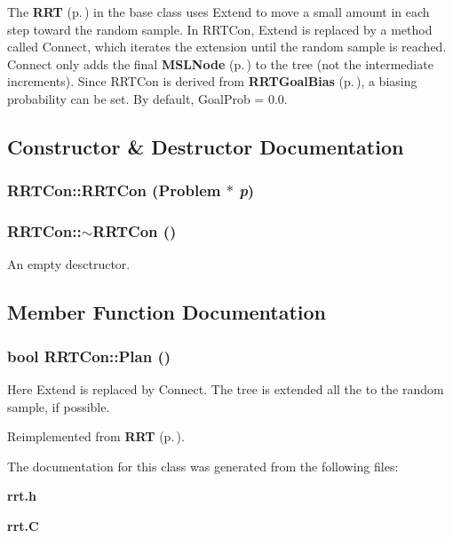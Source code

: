 The {\bf RRT} {\rm (p.\,\pageref{classRRT})} in the base class uses Extend to move a small amount in each step toward the random sample. In RRTCon, Extend is replaced by a method called Connect, which iterates the extension until the random sample is reached. Connect only adds the final  {\bf MSLNode} {\rm (p.\,\pageref{classMSLNode})} to the tree (not the intermediate increments). Since RRTCon is derived from {\bf RRTGoal\-Bias} {\rm (p.\,\pageref{classRRTGoalBias})}, a biasing probability can be set. By default, Goal\-Prob = 0.0. 



\subsection{Constructor \& Destructor Documentation}
\subsubsection{\setlength{\rightskip}{0pt plus 5cm}RRTCon::RRTCon ({\bf Problem} $\ast$ {\em p})}\label{classRRTCon_a0}


\subsubsection{\setlength{\rightskip}{0pt plus 5cm}RRTCon::$\sim$RRTCon ()\hspace{0.3cm}{\tt  [inline, virtual]}}\label{classRRTCon_a1}


An empty desctructor.



\subsection{Member Function Documentation}
\subsubsection{\setlength{\rightskip}{0pt plus 5cm}bool RRTCon::Plan ()\hspace{0.3cm}{\tt  [virtual]}}\label{classRRTCon_a2}


Here Extend is replaced by Connect. The tree is extended all the to the random sample, if possible.



Reimplemented from {\bf RRT} {\rm (p.\,\pageref{classRRT_a3})}.

The documentation for this class was generated from the following files:\begin{CompactItemize}
\item 
{\bf rrt.h}\item 
{\bf rrt.C}\end{CompactItemize}
